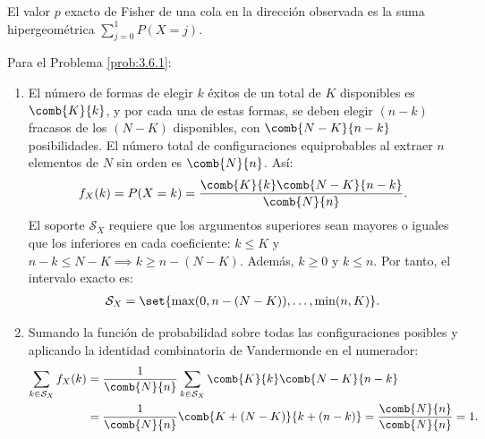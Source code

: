 \begin{sugerencia}
	El valor $p$ exacto de Fisher de una cola en la dirección observada es la suma hipergeométrica $\sum_{j=0}^{1} P(X=j)$.
\end{sugerencia}


\begin{solucion}
	\label{sol:3.6.1}
	Para el Problema \ref{prob:3.6.1}:
	\begin{enumerate}
		\item El número de formas de elegir $k$ éxitos de un total de $K$ disponibles es $\comb{K}{k}$, y por cada una de estas formas, se deben elegir $(n-k)$ fracasos de los $(N-K)$ disponibles, con $\comb{N-K}{n-k}$ posibilidades. El número total de configuraciones equiprobables al extraer $n$ elementos de $N$ sin orden es $\comb{N}{n}$. Así:
		\begin{align*}
			f_X(k) = P(X=k) = \dfrac{\comb{K}{k}\comb{N-K}{n-k}}{\comb{N}{n}}.
		\end{align*}
		El soporte $\mathcal{S}_X$ requiere que los argumentos superiores sean mayores o iguales que los inferiores en cada coeficiente: $k \le K$ y $n-k \le N-K \implies k \ge n-(N-K)$. Además, $k \ge 0$ y $k \le n$. Por tanto, el intervalo exacto es:
		\begin{align*}
			\mathcal{S}_X = \set{\max(0, n-(N-K)), \dots, \min(n, K)}.
		\end{align*}
		\item Sumando la función de probabilidad sobre todas las configuraciones posibles y aplicando la identidad combinatoria de Vandermonde en el numerador:
		\begin{align*}
			\sum_{k \in \mathcal{S}_X} f_X(k) &= \dfrac{1}{\comb{N}{n}} \sum_{k \in \mathcal{S}_X} \comb{K}{k}\comb{N-K}{n-k} \\
			&= \dfrac{1}{\comb{N}{n}} \comb{K + (N-K)}{k + (n-k)} = \dfrac{\comb{N}{n}}{\comb{N}{n}} = 1.
		\end{align*}
	\end{enumerate}
\end{solucion}

